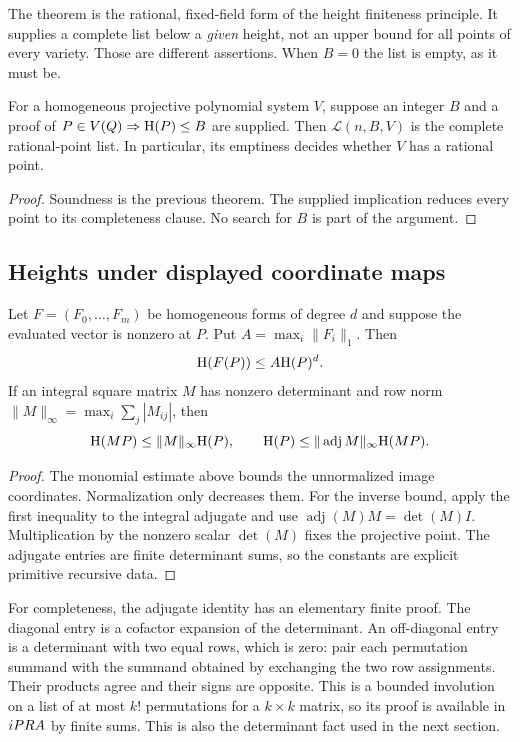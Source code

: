 The theorem is the rational, fixed-field form of the height finiteness
principle. It supplies a complete list below a \emph{given} height, not an
upper bound for all points of every variety. Those are different assertions.
When $B=0$ the list is empty, as it must be.

\begin{corollary}\label{cor:heightbound}
For a homogeneous projective polynomial system $V$, suppose an integer $B$ and a proof of
$P\in V(Q)\Rightarrow\mathrm H(P)\le B$ are supplied. Then
$\mathcal L(n,B,V)$ is the complete rational-point list. In particular,
its emptiness decides whether $V$ has a rational point.
\end{corollary}
\begin{proof}
Soundness is the previous theorem. The supplied implication reduces every
point to its completeness clause. No search for $B$ is part of the argument.
\end{proof}

\subsection{Heights under displayed coordinate maps}

\begin{proposition}\label{prop:upperheight}
Let $F=(F_0,\ldots,F_m)$ be homogeneous forms of degree $d$ and suppose
the evaluated vector is nonzero at $P$. Put
$A=\max_i\|F_i\|_1$. Then
\[
                 \mathrm H(F(P))\le A\mathrm H(P)^d.
\]
If an integral square matrix $M$ has nonzero determinant and row norm
$\|M\|_\infty=\max_i\sum_j|M_{ij}|$, then
\[
 \mathrm H(MP)\le\|M\|_\infty\mathrm H(P),\qquad
 \mathrm H(P)\le\|\operatorname{adj}M\|_\infty\mathrm H(MP).
\]
\end{proposition}
\begin{proof}
The monomial estimate above bounds the unnormalized image coordinates.
Normalization only decreases them. For the inverse bound, apply the first
inequality to the integral adjugate and use
$\operatorname{adj}(M)M=\det(M)I$. Multiplication by the nonzero scalar
$\det(M)$ fixes the projective point. The adjugate entries are finite
determinant sums, so the constants are explicit primitive recursive data.
\end{proof}

For completeness, the adjugate identity has an elementary finite proof.
The diagonal entry is a cofactor expansion of the determinant. An off-diagonal
entry is a determinant with two equal rows, which is zero: pair each
permutation summand with the summand obtained by exchanging the two row
assignments. Their products agree and their signs are opposite. This is a
bounded involution on a list of at most $k!$ permutations for a $k\times k$
matrix, so its proof is available in $iPRA$ by finite sums. This is also the
determinant fact used in the next section.

